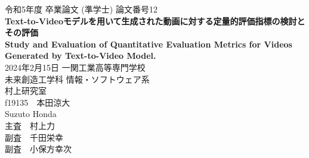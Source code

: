 \documentclass[11pt,a4j]{jreport}
\begin{document}
\thispagestyle{empty}
\begin{center}
    \vspace{20mm}
    {\Large\noindent 令和5年度 卒業論文 (準学士) 論文番号12} \\
    \vspace{40mm}
    {\Huge\noindent\textbf{Text-to-Videoモデルを用いて生成された動画に対する定量的評価指標の検討とその評価}}\\
    \medskip
    {\Large\noindent\textbf{Study and Evaluation of Quantitative Evaluation Metrics for Videos Generated by Text-to-Video Model.}}\\
    \vspace{40mm}
    {
        \Large\noindent
        2024年2月15日
        \vspace{\baselineskip}
        一関工業高等専門学校\\
        未来創造工学科 情報・ソフトウェア系 \\
        \vspace{\baselineskip}
        村上研究室 \\
        f19135　本田涼大\\
        Suzuto Honda \\
        \vspace{\baselineskip}
        主査　村上力    \\
        副査　千田栄幸 \\
        副査　小保方幸次 
    }
    \vspace{40mm}
\end{center}

\thispagestyle{empty}
\newpage
\end{document}
